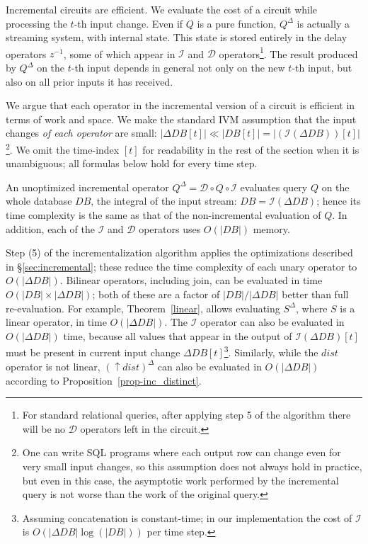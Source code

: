\documentclass[twocolumn
]{svjour3}
\numberwithin{equation}{section}
\newcommand{\zm}{\ensuremath{z^{-1}}} %
\newcommand{\I}{\mathcal{I}}  %
\newcommand{\D}{\mathcal{D}}  %
\newcommand{\I}{\mathit{I}}  %
\newcommand{\D}{\mathit{D}}  %
\newcommand{\inc}[1]{{#1}^{\Delta}}
\newcommand{\distinct}{\mathit{dist}}  %
\newcommand{\secref}[1]{\S\ref{#1}}  %
\newcommand{\lift}[1]{{\uparrow}#1}
\begin{document}
Incremental circuits are efficient.  We evaluate the cost of a circuit
while processing the $t$-th input change.  Even if $Q$ is a pure
function, $\inc{Q}$ is actually a streaming system, with internal
state.  This state is stored entirely in the delay operators $\zm$,
some of which appear in $\I$ and $\D$ operators\footnote{For
standard relational queries, after applying step 5 of the algorithm
there will be no $\D$ operators left in the circuit.}.  The result
produced by $\inc{Q}$ on the $t$-th input depends in general not only
on the new $t$-th input, but also on all prior inputs it has received.

We argue that each operator in the incremental version of a circuit is
efficient in terms of work and space.  We make the standard IVM
assumption that the input changes \emph{of each operator} are small:
$|\Delta DB[t]| \ll |DB[t]| = |(\I(\Delta DB))[t]|$\footnote{One can
write SQL programs where each output row can change even for very
small input changes, so this assumption does not always hold in
practice, but even in this case, the asymptotic work performed by the
incremental query is not worse than the work of the original query.}.
We omit the time-index $[t]$ for readability in the rest of the
section when it is unambiguous; all formulas below hold for every time
step.

An unoptimized incremental operator $\inc{Q} = \D \circ Q \circ \I$
evaluates query $Q$ on the whole database $DB$, the integral of the
input stream: $DB = \I(\Delta DB)$; hence its time complexity is the
same as that of the non-incremental evaluation of $Q$.  In addition,
each of the $\I$ and $\D$ operators uses $O(|DB|)$ memory.

Step (5) of the incrementalization algorithm applies the optimizations
described in \secref{sec:incremental}; these reduce the time
complexity of each unary operator to $O(|\Delta DB|)$.  Bilinear
operators, including join, can be evaluated in time $O(|DB| \times
|\Delta DB|)$; both of these are a factor of $|DB| / |\Delta DB|$
better than full re-evaluation.  For example, Theorem~\ref{linear},
allows evaluating $\inc{S}$, where $S$ is a linear operator, in time
$O(|\Delta DB|)$.  The $\I$ operator can also be evaluated in
$O(|\Delta DB|)$ time, because all values that appear in the output of
$\I(\Delta DB)[t]$ must be present in current input change $\Delta
DB[t]$\footnote{Assuming concatenation is constant-time; in our
implementation the cost of $\I$ is $O(|\Delta DB| \log(|DB|))$ per
time step.}.  Similarly, while the $\distinct$ operator is not linear,
$\inc{(\lift{\distinct})}$ can also be evaluated in $O(|\Delta DB|)$
according to Proposition~\ref{prop-inc_distinct}.
\end{document}
